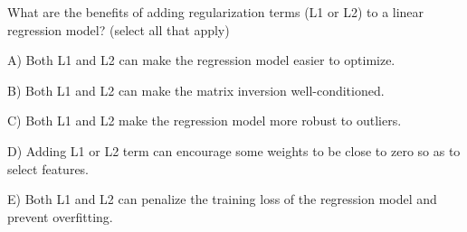 What are the benefits of adding regularization terms (L1 or L2) to a linear regression model? (select all that apply)


A) Both L1 and L2 can make the regression model easier to optimize.


B) Both L1 and L2 can make the matrix inversion well-conditioned.


C) Both L1 and L2 make the regression model more robust to outliers.


D) Adding L1 or L2 term can encourage some weights to be close to zero so as to select features.


E) Both L1 and L2 can penalize the training loss of the regression model and prevent overfitting.
